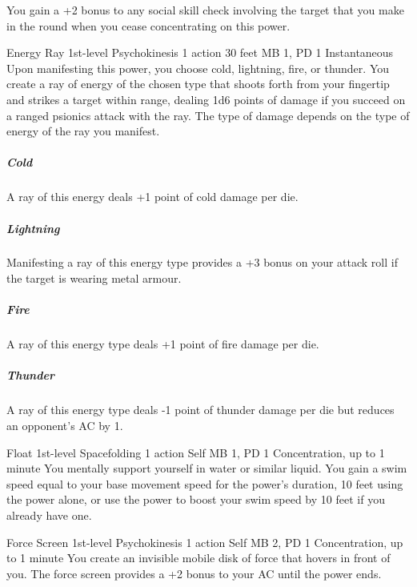 You gain a +2 bonus to any social skill check involving the target
that you make in the round when you cease concentrating on this power.

\DndPowerHeader%
  {Energy Ray}
  {1st-level Psychokinesis}
  {1 action}
  {30 feet}
  {MB 1, PD 1}
  {Instantaneous}
Upon manifesting this power,
you choose cold, lightning, fire, or thunder.
You create a ray of energy of the chosen type that
shoots forth from your fingertip and strikes a target within range,
dealing 1d6 points of damage if you succeed on a
ranged psionics attack with the ray.
The type of damage depends on
the type of energy of the ray you manifest. 
  \subparagraph{Cold}
    A ray of this energy deals +1 point of cold damage per die.
  \subparagraph{Lightning}
    Manifesting a ray of this energy type provides a
    +3 bonus on your attack roll if the target is wearing metal armour.
  \subparagraph{Fire}
    A ray of this energy type deals +1 point of fire damage per die.
  \subparagraph{Thunder}
    A ray of this energy type deals -1 point of thunder damage per die
    but reduces an opponent's AC by 1.

\DndPowerHeader%
  {Float}
  {1st-level Spacefolding}
  {1 action}
  {Self}
  {MB 1, PD 1}
  {Concentration, up to 1 minute}
You mentally support yourself in water or similar liquid.
You gain a swim speed equal to your base movement speed for
the power's duration, 10 feet using the power alone,
or use the power to boost your swim speed by 10 feet if you already have one.

\DndPowerHeader%
  {Force Screen}
  {1st-level Psychokinesis}
  {1 action}
  {Self}
  {MB 2, PD 1}
  {Concentration, up to 1 minute}
You create an invisible mobile disk of force that hovers in front of you.
The force screen provides a +2 bonus to your AC until the power ends.

